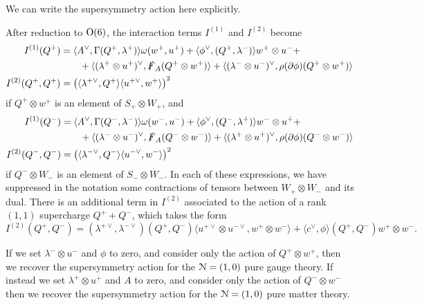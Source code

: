 \documentclass[10pt, oneside]{article}
\begin{document}
We can write the supersymmetry action here explicitly. 

\begin{prop} \label{O6_decomposition_of_susy_prop}
After reduction to $\mathrm{O}(6)$, the interaction terms $I^{(1)}$ and $I^{(2)}$ become
\begin{align*}
I^{(1)}(Q^+) &= \langle A^\vee, \Gamma(Q^+, \lambda^+)\rangle\omega(w^+,u^+) + \langle \phi^\vee, (Q^+,\lambda^-)\rangle w^+ \otimes u^- + \\&\qquad + \langle (\lambda^{+} \otimes u^+)^\vee, \slashed{F}_A (Q^+ \otimes w^+) \rangle + \langle (\lambda^{-} \otimes u^-)^\vee, \rho(\partial \phi)(Q^+ \otimes w^+) \rangle\\
I^{(2)}(Q^+, Q^+) &= \left(\langle\lambda^{+\vee},Q^+\rangle\langle u^{+\vee}, w^+ \rangle\right)^2
\end{align*}
if $Q^+ \otimes w^+$ is an element of $S_+ \otimes W_+$, and
\begin{align*}
I^{(1)}(Q^-) &= \langle A^\vee, \Gamma(Q^-, \lambda^-)\rangle\omega(w^-,u^-) + \langle \phi^\vee, (Q^-,\lambda^+)\rangle w^- \otimes u^+ + \\&\qquad + \langle (\lambda^{-} \otimes u^-)^\vee, \slashed{F}_A (Q^- \otimes w^-) \rangle + \langle (\lambda^{+} \otimes u^+)^\vee, \rho(\partial \phi)(Q^- \otimes w^-) \rangle\\
I^{(2)}(Q^-, Q^-) &= \left(\langle\lambda^{-\vee},Q^-\rangle\langle u^{-\vee}, w^- \rangle\right)^2
\end{align*}
if $Q^- \otimes W_-$ is an element of $S_- \otimes W_-$.  In each of these expressions, we have suppressed in the notation some contractions of tensors between $W_+ \otimes W_-$ and its dual.  There is an additional term in $I^{(2)}$ associated to the action of a rank $(1,1)$ supercharge $Q^+ + Q^-$, which takes the form
\[I^{(2)}(Q^+, Q^-) = (\lambda^{+\vee}, \lambda^{-\vee})(Q^+,Q^-) \langle u^{+\vee} \otimes u^{-\vee}, w^+ \otimes w^-\rangle + \langle c^\vee, \phi \rangle(Q^+,Q^-) w^+ \otimes w^-. \]
\end{prop}

\begin{remark}
If we set $\lambda^- \otimes u^-$ and $\phi$ to zero, and consider only the action of $Q^+ \otimes w^+$, then we recover the supersymmetry action for the $\mathcal{N}=(1,0)$ pure gauge theory.  If instead we set $\lambda^+ \otimes u^+$ and $A$ to zero, and consider only the action of $Q^- \otimes w^-$ then we recover the supersymmetry action for the $\mathcal{N}=(1,0)$ pure matter theory.
\end{remark}
\end{document}
